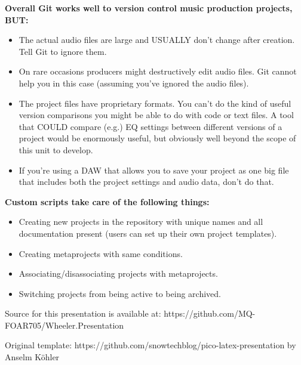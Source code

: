 \documentclass[unknownkeysallowed,usepdftitle=false, parskip=full]{beamer}
\newcommand{\secvariable}{nothing}
\newcommand{\mysection}[1]{\renewcommand{\secvariable}{#1}
}
\begin{document}
\mysection{git}
\begin{frame}\label{\secvariable}
\parbox{\linewidth}{
    \textbf{Overall Git works well to version control music production projects, BUT:}
    \begin{itemize}
        \item The actual audio files are large and USUALLY don't change after creation. Tell Git to ignore them.
        \item On rare occasions producers might destructively edit audio files. Git cannot help you in this case (assuming you've ignored the audio files).
        \item The project files have proprietary formats. You can't do the kind of useful version comparisons you might be able to do with code or text files. A tool that COULD compare (e.g.) EQ settings between different versions of a project would be enormously useful, but obviously well beyond the scope of this unit to develop.
        \item If you're using a DAW that allows you to save your project as one big file that includes both the project settings and audio data, don't do that.
    \end{itemize}
}  
\end{frame}

\mysection{scripts}
\begin{frame}\label{\secvariable}
\parbox{\linewidth}{
\textbf{Custom scripts take care of the following things:}
\begin{itemize}
    \item Creating new projects in the repository with unique names and all documentation present (users can set up their own project templates).
    \item Creating metaprojects with same conditions.
    \item Associating/disassociating projects with metaprojects.
    \item Switching projects from being active to being archived.
\end{itemize}
}
\end{frame}

\mysection{credits}
\begin{frame}\label{\secvariable}
  
Source for this presentation is available at: https://github.com/MQ-FOAR705/Wheeler.Presentation

\vspace{12pt}

Original template: https://github.com/snowtechblog/pico-latex-presentation by Anselm Köhler
  
\end{frame}
\end{document}
